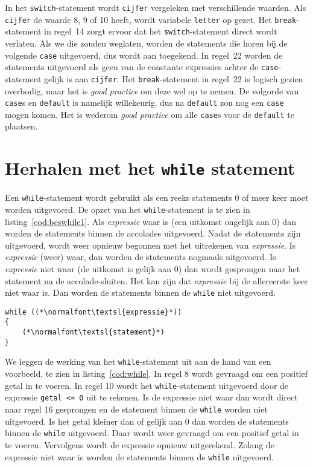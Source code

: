In het \texttt{switch}-statement wordt \texttt{cijfer} vergeleken met verschillende waarden. Als \texttt{cijfer} de waarde 8, 9  of 10 heeft, wordt variabele \texttt{letter} op  gezet. Het \texttt{break}-statement in regel~14 zorgt ervoor dat het \texttt{switch}-statement direct wordt verlaten. Als we die zouden weglaten, worden de statements die horen bij de volgende \texttt{case} uitgevoerd, dus wordt  aan  toegekend. In regel~22 worden de statements uitgevoerd als geen van de constante expressies achter de \texttt{case}-statement gelijk is aan \texttt{cijfer}.
Het \texttt{break}-statement in regel~22 is logisch gezien overbodig, maar het is \textsl{good practice} om deze wel op te nemen. De volgorde van \texttt{case}s en \texttt{default} is namelijk willekeurig, dus na \texttt{default} zou nog een \texttt{case} mogen komen. Het is wederom \textsl{good practice} om alle \texttt{case}s voor de \texttt{default} te plaatsen.

\section{Herhalen met het \texttt{while} statement}
Een \texttt{while}-statement wordt gebruikt als een reeks statements 0 of meer keer moet worden uitgevoerd. De opzet van het \texttt{while}-statement is te zien in listing~\ref{cod:beswhile1}. Als \textsl{expressie} waar is (een uitkomst ongelijk aan 0) dan worden de statements binnen de accolades uitgevoerd. Nadat de statements zijn uitgevoerd, wordt weer opnieuw begonnen met het uitrekenen van \textsl{expressie}. Is \textsl{expressie} (weer) waar, dan worden de statements nogmaals uitgevoerd. Is \textsl{expressie} niet waar (de uitkomst is gelijk aan 0) dan wordt gesprongen naar het statement na de accolade-sluiten. Het kan zijn dat \textsl{expressie} bij de allereerste keer niet waar is. Dan worden de statements binnen de \texttt{while} niet uitgevoerd.

\begin{lstlisting}[caption=Opzet \texttt{while}-statement.,label=cod:beswhile1]
while ((*\normalfont\textsl{expressie}*))
{
    (*\normalfont\textsl{statement}*)
}
\end{lstlisting}

We leggen de werking van het \texttt{while}-statement uit aan de hand van een voorbeeld, te zien in listing~\ref{cod:while}. In regel 8 wordt gevraagd om een positief getal in te voeren. In regel 10 wordt het \texttt{while}-statement uitgevoerd door de expressie \texttt{getal <= 0} uit te rekenen. Is de expressie niet waar dan wordt direct naar regel 16 gesprongen en de statement binnen de \texttt{while} worden niet uitgevoerd. Is het getal kleiner dan of gelijk aan 0 dan worden de statements binnen de \texttt{while} uitgevoerd. Daar wordt weer gevraagd om een positief getal in te voeren. Vervolgens wordt de expressie opnieuw uitgerekend. Zolang de expressie niet waar is worden de statements binnen de \texttt{while} uitgevoerd.

